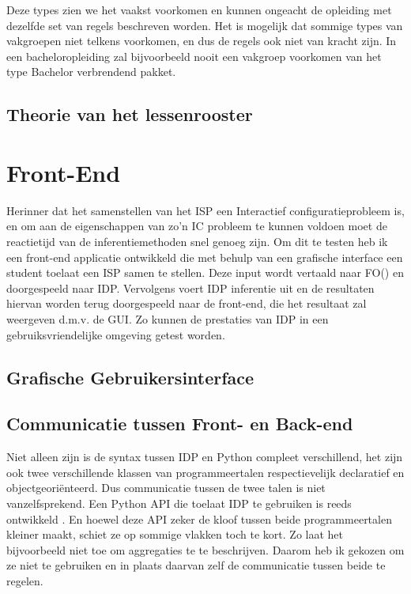 Deze types zien we het vaakst voorkomen en kunnen ongeacht de opleiding met dezelfde set van regels beschreven worden. Het is mogelijk dat sommige types van vakgroepen niet telkens voorkomen, en dus de regels ook niet van kracht zijn. In een bacheloropleiding zal bijvoorbeeld nooit een vakgroep voorkomen van het type Bachelor verbrendend pakket. 

\subsection{Theorie van het lessenrooster}



\section{Front-End}
Herinner dat het samenstellen van het ISP een Interactief configuratieprobleem is, en om aan de eigenschappen van zo'n IC probleem te kunnen voldoen moet de reactietijd van de inferentiemethoden snel genoeg zijn. Om dit te testen heb ik een front-end applicatie ontwikkeld die met behulp van een grafische interface een student toelaat een ISP samen te stellen. Deze input wordt vertaald naar FO(\textperiodcentered) en doorgespeeld naar IDP. Vervolgens voert IDP inferentie uit en de resultaten hiervan worden terug doorgespeeld naar de front-end, die het resultaat zal weergeven d.m.v. de GUI. Zo kunnen de prestaties van IDP in een gebruiksvriendelijke omgeving getest worden. 

\subsection{Grafische Gebruikersinterface}



\subsection{Communicatie tussen Front- en Back-end}
Niet alleen zijn is de syntax tussen IDP en Python compleet verschillend, het zijn ook twee verschillende klassen van programmeertalen respectievelijk declaratief en objectgeori\"{e}nteerd. Dus communicatie tussen de twee talen is niet vanzelfsprekend. Een Python API die toelaat IDP te gebruiken is reeds ontwikkeld \citep{vennekens2015lowering}. En hoewel deze API zeker de kloof tussen beide programmeertalen kleiner maakt, schiet ze op sommige vlakken toch te kort. Zo laat het bijvoorbeeld niet toe om aggregaties te te beschrijven. Daarom heb ik gekozen om ze niet te gebruiken en in plaats daarvan zelf de communicatie tussen beide te regelen. 

